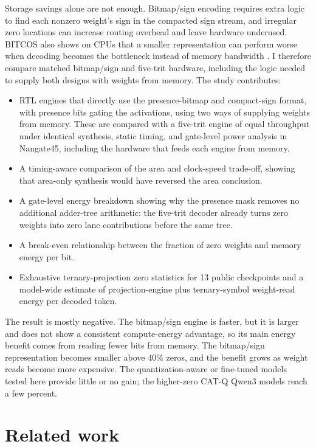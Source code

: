 \documentclass[11pt]{article}
\begin{document}
Storage savings alone are not enough. Bitmap/sign encoding requires extra logic to find each nonzero weight's sign in the compacted sign stream, and irregular zero locations can increase routing overhead and leave hardware underused. BITCOS also shows on CPUs that a smaller representation can perform worse when decoding becomes the bottleneck instead of memory bandwidth \cite{georganas2026bitcos}. I therefore compare matched bitmap/sign and five-trit hardware, including the logic needed to supply both designs with weights from memory. The study contributes:
\begin{itemize}
\item RTL engines that directly use the presence-bitmap and compact-sign format, with presence bits gating the activations, using two ways of supplying weights from memory. These are compared with a five-trit engine of equal throughput under identical synthesis, static timing, and gate-level power analysis in Nangate45, including the hardware that feeds each engine from memory.
\item A timing-aware comparison of the area and clock-speed trade-off, showing that area-only synthesis would have reversed the area conclusion.
\item A gate-level energy breakdown showing why the presence mask removes no additional adder-tree arithmetic: the five-trit decoder already turns zero weights into zero lane contributions before the same tree.
\item A break-even relationship between the fraction of zero weights and memory energy per bit.
\item Exhaustive ternary-projection zero statistics for 13 public checkpoints and a model-wide estimate of projection-engine plus ternary-symbol weight-read energy per decoded token.
\end{itemize}
The result is mostly negative. The bitmap/sign engine is faster, but it is larger and does not show a consistent compute-energy advantage, so its main energy benefit comes from reading fewer bits from memory. The bitmap/sign representation becomes smaller above 40\% zeros, and the benefit grows as weight reads become more expensive. The quantization-aware or fine-tuned models tested here provide little or no gain; the higher-zero CAT-Q Qwen3 models reach a few percent.

\section{Related work}
\end{document}
